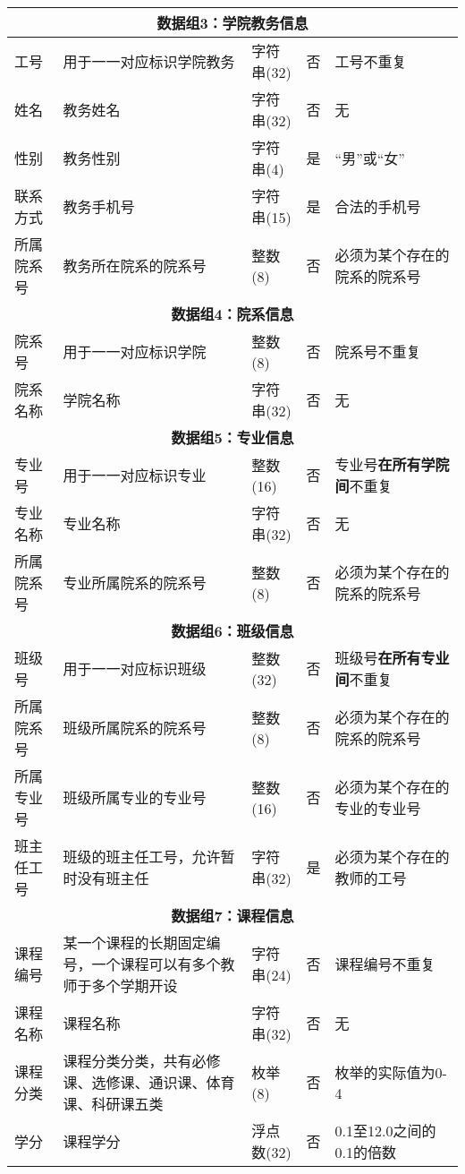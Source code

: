 \begin{center}
\begin{longtable}{p{6em}p{16em}p{8em}p{2em}p{16em}}
        \multicolumn{5}{c}{\textbf{数据组3：学院教务信息}} \\
        \midrule
        工号 & 用于一一对应标识学院教务 & 字符串(32) & 否 & 工号不重复 \\   
        姓名 & 教务姓名 & 字符串(32) & 否 & 无 \\
        性别 & 教务性别 & 字符串(4) & 是 & “男”或“女” \\
        联系方式 & 教务手机号 & 字符串(15) & 是 & 合法的手机号 \\
        所属院系号 & 教务所在院系的院系号 & 整数(8) & 否 & 必须为某个存在的院系的院系号 \\
        \midrule

        \multicolumn{5}{c}{\textbf{数据组4：院系信息}} \\
        \midrule
        院系号 & 用于一一对应标识学院 & 整数(8) & 否 & 院系号不重复 \\
        院系名称 & 学院名称 & 字符串(32) & 否 & 无 \\
        \midrule

        \multicolumn{5}{c}{\textbf{数据组5：专业信息}} \\
        \midrule
        专业号 & 用于一一对应标识专业 & 整数(16) & 否 & 专业号\textbf{在所有学院间}不重复 \\
        专业名称 & 专业名称 & 字符串(32) & 否 & 无 \\
        所属院系号 & 专业所属院系的院系号 & 整数(8) & 否 & 必须为某个存在的院系的院系号 \\
        \midrule

        \multicolumn{5}{c}{\textbf{数据组6：班级信息}} \\
        \midrule
        班级号 & 用于一一对应标识班级 & 整数(32) & 否 & 班级号\textbf{在所有专业间}不重复 \\
        所属院系号 & 班级所属院系的院系号 & 整数(8) & 否 & 必须为某个存在的院系的院系号 \\
        所属专业号 & 班级所属专业的专业号 & 整数(16) & 否 & 必须为某个存在的专业的专业号 \\
        班主任工号 & 班级的班主任工号，允许暂时没有班主任 & 字符串(32) & 是 & 必须为某个存在的教师的工号 \\
        \midrule

        \multicolumn{5}{c}{\textbf{数据组7：课程信息}} \\
        \midrule
        课程编号 & 某一个课程的长期固定编号，一个课程可以有多个教师于多个学期开设 & 字符串(24) & 否 & 课程编号不重复 \\
        课程名称 & 课程名称 & 字符串(32) & 否 & 无 \\
        课程分类 & 课程分类分类，共有必修课、选修课、通识课、体育课、科研课五类 & 枚举(8) & 否 & 枚举的实际值为0-4 \\
        学分 & 课程学分 & 浮点数(32) & 否 & 0.1至12.0之间的0.1的倍数 \\
        \midrule


\end{longtable}
\end{center}
